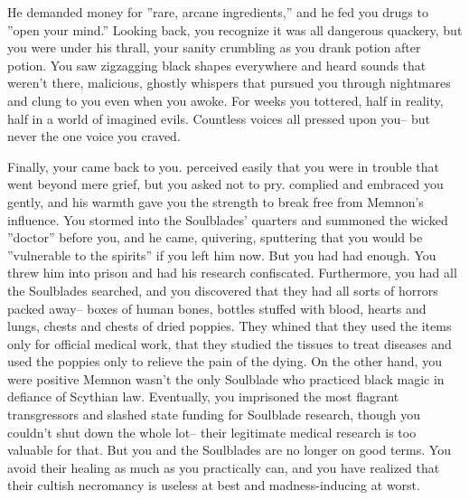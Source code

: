 \documentclass[char]{Kos}
\begin{document}
He demanded money for ''rare, arcane ingredients,'' and he fed you drugs to ''open your mind.'' Looking back, you recognize it was all dangerous quackery, but you were under his thrall, your sanity crumbling as you drank potion after potion. You saw zigzagging black shapes everywhere and heard sounds that weren't there, malicious, ghostly whispers that pursued you through nightmares and clung to you even when you awoke. For weeks you tottered, half in reality, half in a world of imagined evils. Countless voices all pressed upon you-- but never the one voice you craved.

Finally, your \cScythiaKing{\spouse} came back to you. \cScythiaKing{\They} perceived easily that you were in trouble that went beyond mere grief, but you asked \cScythiaKing{\them} not to pry. \cScythiaKing{\They} complied and embraced you gently, and his warmth gave you the strength to break free from Memnon's influence. You stormed into the Soulblades' quarters and summoned the wicked ''doctor'' before you, and he came, quivering, sputtering that you would be ''vulnerable to the spirits'' if you left him now. But you had had enough. You threw him into prison and had his research confiscated. Furthermore, you had all the Soulblades searched, and you discovered that they had all sorts of horrors packed away-- boxes of human bones, bottles stuffed with blood, hearts and lungs, chests and chests of dried poppies. They whined that they used the items only for official medical work, that they studied the tissues to treat diseases and used the poppies only to relieve the pain of the dying. On the other hand, you were positive Memnon wasn't the only Soulblade who practiced black magic in defiance of Scythian law. Eventually, you imprisoned the most flagrant transgressors and slashed state funding for Soulblade research, though you couldn't shut down the whole lot-- their legitimate medical research is too valuable for that. But you and the Soulblades are no longer on good terms. You avoid their healing as much as you practically can, and you have realized that their cultish necromancy is useless at best and madness-inducing at worst.
\end{document}
